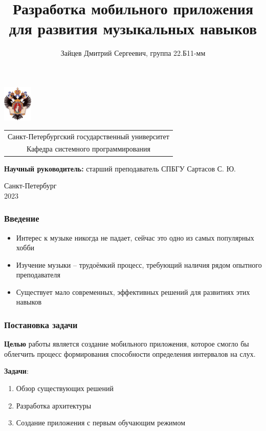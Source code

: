 \documentclass{beamer}
\title[Короткое название]{Разработка мобильного приложения для развития музыкальных навыков}
\institute[СПбГУ]{}
\author[Зайцев Дмитрий]{Зайцев Дмитрий Сергеевич, группа 22.Б11-мм}
\begin{document}
{
\begin{frame}
  \includegraphics[width=1.4cm]{pictures/SPbGU_Logo.png}
\vspace{-35pt}
\hspace{-10pt}
\begin{center}
   \begin{tabular}{c}
        \scriptsize{Санкт-Петербургский государственный университет} \\
        \scriptsize{Кафедра системного программирования}
    \end{tabular}
\titlepage
\end{center}

\btVFill

{\scriptsize
   \textbf{Научный руководитель:} старший преподаватель СПБГУ Сартасов С. Ю. \\
 }
\begin{center}
  \vspace{5pt}
  \scriptsize{Санкт-Петербург\\
                 2023}
  \end{center}

\end{frame}
}

\begin{frame}[fragile]  
  \frametitle{Введение}
  \begin{itemize}
    \item Интерес к музыке никогда не падает, сейчас это одно из самых популярных хобби
    \item Изучение музыки -- трудоёмкий процесс, требующий наличия рядом опытного преподавателя
    \item Существует мало современных, эффективных решений для развитиях этих навыков
  \end{itemize}
\end{frame}
           
\begin{frame}
  \frametitle{Постановка задачи}
  \textbf{Целью} работы является создание мобильного приложения, которое смогло бы облегчить
процесс формирования способности определения интервалов на слух.

  \textbf{Задачи}:
  \begin{enumerate}
    \item Обзор существующих решений
    \item Разработка архитектуры
    \item Создание приложения с первым обучающим режимом
  \end{enumerate}
\end{frame}           
            
\end{document}
